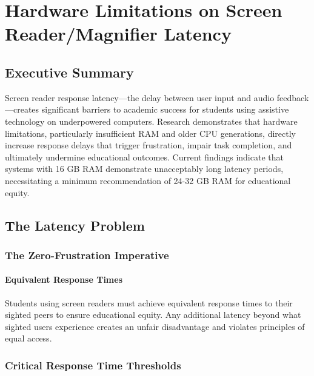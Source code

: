 \chapter{Hardware Limitations on Screen Reader/Magnifier Latency}\label{vision-assistive-technology-laptop-computer-requirements}
\raggedright
\section{Executive Summary}\label{executive-summary}

Screen reader response latency—the delay between user input and audio feedback—creates significant barriers to academic success for students using assistive technology on underpowered computers. Research demonstrates that hardware limitations, particularly insufficient RAM and older CPU generations, directly increase response delays that trigger frustration, impair task completion, and ultimately undermine educational outcomes. Current findings indicate that systems with 16 GB RAM demonstrate unacceptably long latency periods, necessitating a minimum recommendation of 24-32 GB RAM for educational equity.

\section{The Latency Problem}\label{the-latency-problem}

\subsection{The Zero-Frustration Imperative}\label{the-zero-frustration-imperative}

\subsubsection{Equivalent Response Times}

Students using screen readers must achieve equivalent response times to their sighted peers to ensure educational equity. Any additional latency beyond what sighted users experience creates an unfair disadvantage and violates principles of equal access.

\subsection{Critical Response Time Thresholds}\label{critical-response-time-thresholds}

